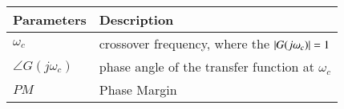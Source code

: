 \begin{tabular}{|p{1.5cm}|p{5.75cm}|}
\hline
\textbf{Parameters} & \textbf{Description} \\
\hline
$\omega_c$ & crossover frequency, where the $\left\vert G(j\omega_c)\right\vert=1$ \\
\hline
$\angle G(j\omega_c)$ & phase angle of the transfer function at $\omega_c$ \\
\hline
$PM$ & Phase Margin\\
\hline
\end{tabular}

